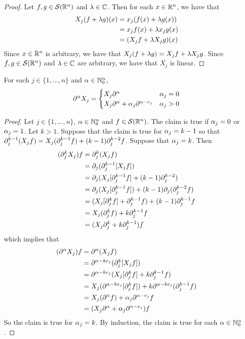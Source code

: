 \documentclass{book}
\begin{document}
	\begin{proof}
		Let $f, g \in \mathcal{S}(\mathbb{R}^n)$ and $\lambda \in \mathbb{C}$. Then for each $x \in \mathbb{R}^n$, we have that
		\begin{align*}
			X_j(f + \lambda g)(x) 
			& = x_j(f(x) + \lambda g(x)) \\
			& = x_jf(x) + \lambda x_j g(x) \\
			& = (X_jf + \lambda X_jg)(x)
		\end{align*} 
		Since $x \in \mathbb{R}^n$ is arbitrary, we have that $X_j(f + \lambda g) = X_jf + \lambda X_jg$. Since $f, g \in \mathcal{S}(\mathbb{R}^n)$ and $\lambda \in \mathbb{C}$ are arbitrary, we have that $X_j$ is linear.
	\end{proof}

	\begin{ex}
		For each $j \in \{1, \ldots, n\}$ and $\alpha \in \mathbb{N}_0^n$, 
		\[
		\partial^{\alpha}X_j = 
		\begin{cases}
			X_j \partial^{\alpha} & \alpha_j = 0 \\
			X_j \partial^{\alpha}  + \alpha_j \partial^{\alpha - e_j}  & \alpha_j > 0 \\
		\end{cases}
		\]
	\end{ex}
	
	\begin{proof}
		Let $j \in \{1, \ldots, n\}$, $\alpha \in \mathbb{N}_0^n$ and $f \in \mathcal{S}(\mathbb{R}^n)$. The claim is true if $\alpha_j = 0$ or $\alpha _j = 1$.  Let $k > 1$. Suppose that the claim is true for $\alpha_j = k - 1$ so that $\partial_j^{k-1}(X_jf)= X_j(\partial_j^{k-1}f) + (k - 1) \partial_j^{k-2} f$. Suppose that $\alpha_j = k$. Then 
		\begin{align*}
			(\partial_j^k X_j) f
			& = \partial_j^k (X_j f) \\
			&= \partial_j (\partial_j^{k-1} [X_jf]) \\
			&= \partial_j (X_j[\partial_j^{k-1}f] + (k - 1) \partial_j^{k-2}) \\
			&= \partial_j (X_j[\partial_j^{k-1}f]) + (k - 1) \partial_j( \partial_j^{k-2} f) \\
			&= (X_j [\partial_j^{k}f] + \partial_j^{k-1}f)  + (k -1) \partial_j^{k-1}f \\
			&= X_j (\partial_j^{k}f) + k \partial_j^{k-1}f \\
			& = (X_j \partial_j^{k} + k \partial_j^{k-1}) f
		\end{align*}
		which implies that  
		\begin{align*}
			(\partial^{\alpha} X_j) f
			& = \partial^{\alpha}(X_j f) \\ 
			& = \partial^{\alpha - k e_j} (\partial_j^{k} [X_j f]) \\
			& = \partial^{\alpha - k e_j} (X_j [\partial_j^{k}f] + k \partial_j^{k-1}f) \\
			& = X_j (\partial^{\alpha - k e_j}[\partial_j^k f]) +  k \partial^{\alpha - k e_j} (\partial_j^{k-1}f) \\
			& = X_j(\partial^{\alpha} f) + \alpha_j \partial^{\alpha - e_j} f \\
			& = (X_j \partial^{\alpha}  + \alpha_j \partial^{\alpha - e_j} )f
		\end{align*}
		So the claim is true for $\alpha_j = k$. By induction, the claim is true for each $\alpha \in \mathbb{N}_0^n$. 
	\end{proof}
	
\end{document}
